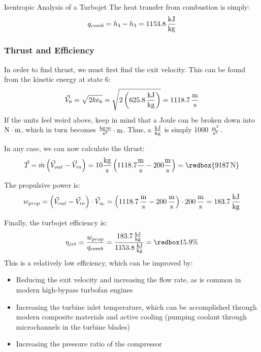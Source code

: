 \begin{example}[label=ex:turbojetIsentropic]{Isentropic Analysis of a Turbojet}
  The heat transfer from combustion is simply:
  \begin{equation*}
    q_{comb} = h_4 - h_3 = 1153.8\, \frac{\rm kJ}{\rm kg}
  \end{equation*}

  \subsubsection*{Thrust and Efficiency}
  In order to find thrust, we must first find the exit velocity.  This can be found from the kinetic energy at state 6:
  \begin{equation*}
    \vec{V}_6 = \sqrt{2 ke_6} = \sqrt{2 \left(625.8\, \frac{\rm kJ}{\rm kg}\right)} = 1118.7\, \frac{\rm m}{\rm s}
  \end{equation*}
  If the units feel weird above, keep in mind that a Joule can be broken down into $\rm N \cdot m$, which in turn becomes $\frac{\rm kg\, m}{\rm s^2} \cdot \rm m$.  Thus, a $\frac{\rm kJ}{\rm kg}$ is simply 1000 $\frac{\rm m^2}{\rm s^2}$.

  In any case, we can now calculate the thrust:
  \begin{equation*}
    \vec{T} = \dot{m} \left(\vec{V}_{out} - \vec{V}_{in}\right) = 10 \frac{\rm kg}{\rm s} \left(1118.7 \frac{\rm m}{\rm s} - 200 \frac{\rm m}{\rm s}\right) = \redbox{9187\, \rm N}
  \end{equation*}

  The propulsive power is:
  \begin{equation*}
    w_{prop} =  \left(\vec{V}_{out} - \vec{V}_{in}\right) \cdot \vec{V}_{\infty} = \left(1118.7\, \frac{\rm m}{\rm s} - 200\, \frac{\rm m}{\rm s}\right) \cdot 200\, \frac{\rm m}{\rm s} = 183.7\, \frac{\rm kJ}{\rm kg}
  \end{equation*}

  Finally, the turbojet efficiency is:
  \begin{equation*}
    \eta_{jet} = \frac{w_{prop}}{q_{comb}} = \frac{183.7\, \frac{\rm kJ}{\rm kg}}{1153.8\, \frac{\rm kJ}{\rm kg}} = \redbox{15.9\%}
  \end{equation*}
  This is a relatively low efficiency, which can be improved by:
  \begin{itemize}
  \item Reducing the exit velocity and increasing the flow rate, as is common in modern high-bypass turbofan engines
  \item Increasing the turbine inlet temperature, which can be accomplished through modern composite materials and active cooling (pumping coolant through microchannels in the turbine blades)
  \item Increasing the pressure ratio of the compressor
  \end{itemize}
\end{example}

